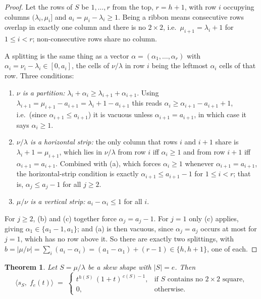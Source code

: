 \documentclass[11pt]{article}
\newtheorem{theorem}{Theorem}
\theoremstyle{definition}
\begin{document}
\begin{proof}
Let the rows of $S$ be $1,\dots,r$ from the top, $r=h+1$, with row $i$ occupying columns
$(\lambda_i,\mu_i]$ and $a_i=\mu_i-\lambda_i\ge1$. Being a ribbon means consecutive rows
overlap in exactly one column and there is no $2\times2$, i.e.\ $\mu_{i+1}=\lambda_i+1$ for
$1\le i<r$; non-consecutive rows share no column.

A splitting is the same thing as a vector $\alpha=(\alpha_1,\dots,\alpha_r)$ with
$\alpha_i=\nu_i-\lambda_i\in[0,a_i]$, the cells of $\nu/\lambda$ in row $i$ being the leftmost
$\alpha_i$ cells of that row. Three conditions:
\begin{enumerate}
\item[(a)] \emph{$\nu$ is a partition:} $\lambda_i+\alpha_i\ge\lambda_{i+1}+\alpha_{i+1}$. Using
$\lambda_{i+1}=\mu_{i+1}-a_{i+1}=\lambda_i+1-a_{i+1}$ this reads
$\alpha_i\ge\alpha_{i+1}-a_{i+1}+1$, i.e.\ (since $\alpha_{i+1}\le a_{i+1}$) it is vacuous
unless $\alpha_{i+1}=a_{i+1}$, in which case it says $\alpha_i\ge1$.
\item[(b)] \emph{$\nu/\lambda$ is a horizontal strip:} the only column that rows $i$ and $i+1$
share is $\lambda_i+1=\mu_{i+1}$, which lies in $\nu/\lambda$ from row $i$ iff $\alpha_i\ge1$
and from row $i+1$ iff $\alpha_{i+1}=a_{i+1}$. Combined with (a), which forces $\alpha_i\ge1$
whenever $\alpha_{i+1}=a_{i+1}$, the horizontal-strip condition is exactly
$\alpha_{i+1}\le a_{i+1}-1$ for $1\le i<r$; that is, $\alpha_j\le a_j-1$ for all $j\ge2$.
\item[(c)] \emph{$\mu/\nu$ is a vertical strip:} $a_i-\alpha_i\le1$ for all $i$.
\end{enumerate}
For $j\ge2$, (b) and (c) together force $\alpha_j=a_j-1$. For $j=1$ only (c) applies, giving
$\alpha_1\in\{a_1-1,a_1\}$; and (a) is then vacuous, since $\alpha_j=a_j$ occurs at most for
$j=1$, which has no row above it. So there are exactly two splittings, with
$b=|\mu/\nu|=\sum_i(a_i-\alpha_i)=(a_1-\alpha_1)+(r-1)\in\{h,h+1\}$, one of each.
\end{proof}

\begin{theorem}\label{thm:A}
Let $S=\mu/\lambda$ be a skew shape with $|S|=e$. Then
\[
\langle s_S,\; f_e(t)\rangle \;=\;
\begin{cases}
t^{h(S)}\,(1+t)^{\,c(S)-1}, & \text{if $S$ contains no $2\times2$ square},\\[2pt]
0, & \text{otherwise.}
\end{cases}
\]
\end{theorem}
\end{document}
